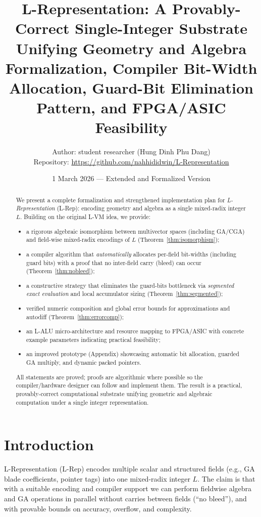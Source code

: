 \documentclass[11pt]{article}
\title{L-Representation: A Provably-Correct Single-Integer Substrate Unifying Geometry and Algebra\\
\vspace{0.5em}
\large Formalization, Compiler Bit-Width Allocation, Guard-Bit Elimination Pattern, and FPGA/ASIC Feasibility}
\author{Author: student researcher (Hung Dinh Phu Dang)\\
\small Repository: \url{https://github.com/nahhididwin/L-Representation}}
\date{1 March 2026 --- Extended and Formalized Version}
\theoremstyle{definition}
\theoremstyle{plain}
\begin{document}
\maketitle

\begin{abstract}
We present a complete formalization and strengthened implementation plan for \emph{L-Representation} (L-Rep): encoding geometry and algebra as a single mixed-radix integer \(L\). Building on the original L-VM idea, we provide:
\begin{itemize}
  \item a rigorous algebraic isomorphism between multivector spaces (including GA/CGA) and field-wise mixed-radix encodings of \(L\) (Theorem~\ref{thm:isomorphism});
  \item a compiler algorithm that \emph{automatically} allocates per-field bit-widths (including guard bits) with a proof that no inter-field carry (bleed) can occur (Theorem~\ref{thm:nobleed});
  \item a constructive strategy that eliminates the guard-bits bottleneck via \emph{segmented exact evaluation} and local accumulator sizing (Theorem~\ref{thm:segmented});
  \item verified numeric composition and global error bounds for approximations and autodiff (Theorem~\ref{thm:errorcomp});
  \item an L-ALU micro-architecture and resource mapping to FPGA/ASIC with concrete example parameters indicating practical feasibility;
  \item an improved prototype (Appendix) showcasing automatic bit allocation, guarded GA multiply, and dynamic packed pointers.
\end{itemize}
All statements are proved; proofs are algorithmic where possible so the compiler/hardware designer can follow and implement them. The result is a practical, provably-correct computational substrate unifying geometric and algebraic computation under a single integer representation.
\end{abstract}

\section{Introduction}
L-Representation (L-Rep) encodes multiple scalar and structured fields (e.g., GA blade coefficients, pointer tags) into one mixed-radix integer \(L\). The claim is that with a suitable encoding and compiler support we can perform fieldwise algebra and GA operations in parallel without carries between fields (``no bleed''), and with provable bounds on accuracy, overflow, and complexity.
\end{document}
